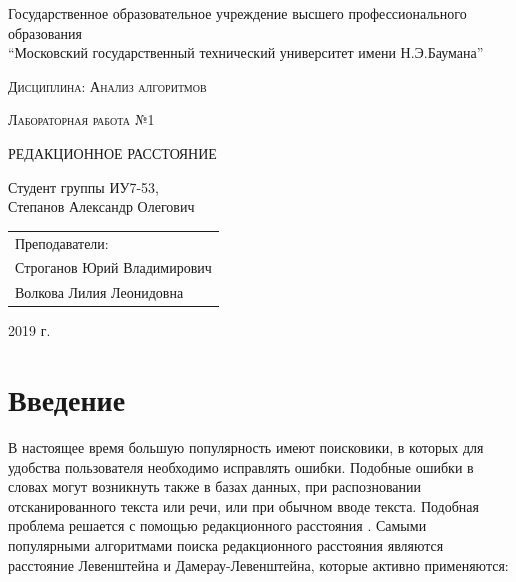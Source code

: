 \documentclass[a4paper,12pt]{article}
\newcommand{\anonsection}[1]{\section*{#1}\addcontentsline{toc}{section}{#1}}
\begin{document}
\begin{titlepage}

    \begin{center}
        \large
        Государственное образовательное учреждение высшего профессионального образования\\
        “Московский государственный технический университет имени Н.Э.Баумана”
        \vspace{3cm}

        \textsc{Дисциплина: Анализ алгоритмов}
        \vspace{0.5cm}

        \textsc{Лабораторная работа №1}
        \vspace{3cm}

        {\LARGE РЕДАКЦИОННОЕ РАССТОЯНИЕ}
        \vspace{3cm}

        Студент группы ИУ7-53,\\
        Степанов Александр Олегович
        \vfill
    \end{center}

    \begin{flushright}
        \begin{tabular}{l}
            Преподаватели:\\
            Строганов Юрий Владимирович\\
            Волкова Лилия Леонидовна
        \end{tabular}
    \end{flushright}

    \begin{center}

        2019 г.

    \end{center}

\end{titlepage}

\tableofcontents

\newpage
\anonsection{Введение}

В настоящее время большую популярность имеют поисковики, в которых для удобства
пользователя необходимо исправлять ошибки. Подобные ошибки в словах могут возникнуть
также в базах данных, при распозновании отсканированного текста или речи, или
при обычном вводе текста. Подобная проблема решается с помощью редакционного
расстояния \cite{habr}.
Самыми популярными алгоритмами поиска редакционного расстояния являются
расстояние Левенштейна и Дамерау-Левенштейна, которые активно применяются:
\end{document}
